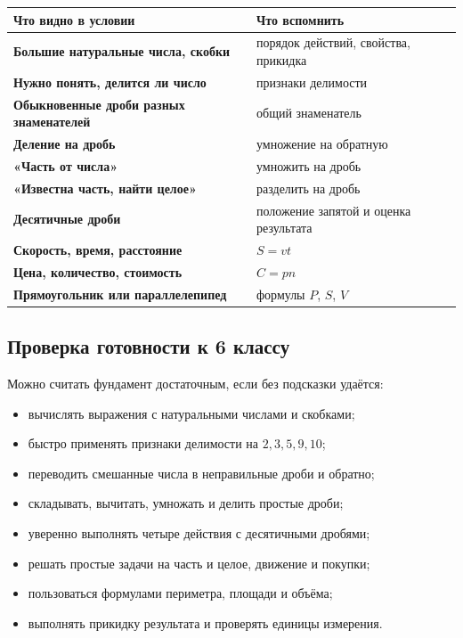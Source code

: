 \documentclass[12pt,a4paper]{article}
\begin{document}
\begin{center}
\begin{tabularx}{\textwidth}{@{}>{\bfseries}X X@{}}
\toprule
Что видно в условии & Что вспомнить \\
\midrule
Большие натуральные числа, скобки & порядок действий, свойства, прикидка \\
Нужно понять, делится ли число & признаки делимости \\
Обыкновенные дроби разных знаменателей & общий знаменатель \\
Деление на дробь & умножение на обратную \\
«Часть от числа» & умножить на дробь \\
«Известна часть, найти целое» & разделить на дробь \\
Десятичные дроби & положение запятой и оценка результата \\
Скорость, время, расстояние & $S=vt$ \\
Цена, количество, стоимость & $C=pn$ \\
Прямоугольник или параллелепипед & формулы $P$, $S$, $V$ \\
\bottomrule
\end{tabularx}
\end{center}

\subsection*{Проверка готовности к 6 классу}
Можно считать фундамент достаточным, если без подсказки удаётся:
\begin{itemize}
  \item вычислять выражения с натуральными числами и скобками;
  \item быстро применять признаки делимости на $2,3,5,9,10$;
  \item переводить смешанные числа в неправильные дроби и обратно;
  \item складывать, вычитать, умножать и делить простые дроби;
  \item уверенно выполнять четыре действия с десятичными дробями;
  \item решать простые задачи на часть и целое, движение и покупки;
  \item пользоваться формулами периметра, площади и объёма;
  \item выполнять прикидку результата и проверять единицы измерения.
\end{itemize}

\newpage
\end{document}
